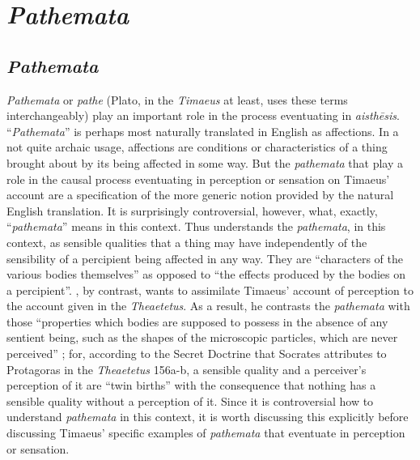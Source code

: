 
\chapter{\emph{Pathemata}} %
\label{cha:pathemata}

\section{\emph{Pathemata}} %
\label{sec:pathemata}

\emph{Pathemata} or \emph{pathe} (Plato, in the \emph{Timaeus} at least, uses these terms interchangeably) play an important role in the process eventuating in \emph{aisthēsis}. ``\emph{Pathemata}'' is perhaps most naturally translated in English as affections. In a not quite archaic usage, affections are conditions or characteristics of a thing brought about by its being affected in some way. But the \emph{pathemata} that play a role in the causal process eventuating in perception or sensation on Timaeus' account are a specification of the more generic notion provided by the natural English translation. It is surprisingly controversial, however, what, exactly, ``\emph{pathemata}'' means in this context. Thus \citet[429-31]{Taylor:1928qb} understands the \emph{pathemata}, in this context, as sensible qualities that a thing may have independently of the sensibility of a percipient being affected in any way. They are ``characters of the various bodies themselves'' as opposed to ``the effects produced by the bodies on a percipient''. \citet[258-9]{Cornford:1935fk}, by contrast, wants to assimilate Timaeus' account of perception to the account given in the \emph{Theaetetus}. As a result, he contrasts the \emph{pathemata} with those ``properties which bodies are supposed to possess in the absence of any sentient being, such as the shapes of the microscopic particles, which are never perceived'' \citep[259]{Cornford:1935fk}; for, according to the Secret Doctrine that Socrates attributes to Protagoras in the \emph{Theaetetus} 156a-b, a sensible quality and a perceiver's perception of it are ``twin births'' with the consequence that nothing has a sensible quality without a perception of it. Since it is controversial how to understand \emph{pathemata} in this context, it is worth discussing this explicitly before discussing Timaeus' specific examples of \emph{pathemata} that eventuate in perception or sensation.

